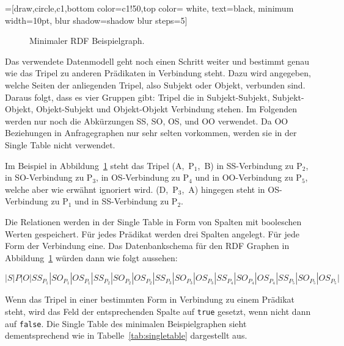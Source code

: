 \documentclass[
  a4paper,
  12pt,
  oneside,
  parskip=half,
  headsepline,
]{scrartcl}
\begin{document}
=[draw,circle,c1,bottom color=c1!50,top color= white, text=black,
                   minimum width=10pt, blur shadow={shadow blur steps=5}]
\begin{figure}[htbp]
	\centering
	\caption{Minimaler RDF Beispielgraph.}
	\label{fig:exampleRDFgraph}
\end{figure}

Das verwendete Datenmodell geht noch einen Schritt weiter und bestimmt genau wie
das Tripel zu anderen Prädikaten in Verbindung steht. Dazu wird angegeben,
welche Seiten der anliegenden Tripel, also Subjekt oder Objekt, verbunden sind.
Daraus folgt, dass es vier Gruppen gibt: Tripel die in Subjekt-Subjekt,
Subjekt-Objekt, Objekt-Subjekt und Objekt-Objekt Verbindung stehen. Im Folgenden
werden nur noch die Abkürzungen SS, SO, OS, und OO verwendet. Da OO Beziehungen
in Anfragegraphen nur sehr selten vorkommen, werden sie in der Single Table nicht
verwendet.

Im Beispiel in Abbildung~\ref{fig:exampleRDFgraph} steht das Tripel (A,~P$_1$,~B)
in SS-Verbindung zu P$_2$, in SO-Verbindung zu P$_3$, in OS-Verbindung zu P$_4$ und in 
OO-Verbindung zu P$_5$, welche aber wie erwähnt ignoriert wird. (D,~P$_3$,~A) hingegen
steht in OS-Verbindung zu P$_1$ und in SS-Verbindung zu P$_2$.

Die Relationen werden in der Single Table in Form von Spalten mit booleschen
Werten gespeichert. Für jedes Prädikat werden drei Spalten angelegt. Für jede Form
der Verbindung eine. Das Datenbankschema für den RDF Graphen in
Abbildung~\ref{fig:exampleRDFgraph} würden dann wie folgt aussehen:

$$\scriptstyle{|S|P|O|SS_{P_1}|SO_{P_1}|OS_{P_1}|SS_{P_2}|SO_{P_2}|OS_{P_2}|SS_{P_3}|SO_{P_3}|OS_{P_3}|SS_{P_4}|SO_{P_4}|OS_{P_4}|SS_{P_5}|SO_{P_5}|OS_{P_5}|}$$

Wenn das Tripel in einer bestimmten Form in Verbindung zu einem Prädikat steht,
wird das Feld der entsprechenden Spalte auf \texttt{true} gesetzt, wenn nicht
dann auf \texttt{false}. Die Single Table des minimalen Beispielgraphen sieht
dementsprechend wie in Tabelle~\ref{tab:singletable} dargestellt aus.
\end{document}
